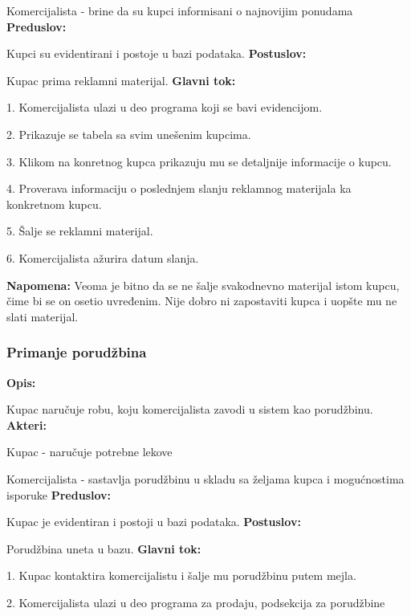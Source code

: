 Komercijalista - brine da su kupci informisani o najnovijim ponudama
\newline
\textbf{Preduslov:}

Kupci su evidentirani i postoje u bazi podataka.
\newline
\textbf{Postuslov:}

Kupac prima reklamni materijal.
\newline
\textbf{Glavni tok:}

1. Komercijalista ulazi u deo programa koji se bavi evidencijom.

2. Prikazuje se tabela sa svim unešenim kupcima. 

3. Klikom na konretnog kupca prikazuju mu se detaljnije informacije o kupcu.

4. Proverava informaciju o poslednjem slanju reklamnog materijala ka konkretnom kupcu.

5. Šalje se reklamni materijal.

6. Komercijalista ažurira datum slanja.

\textbf{Napomena:}
Veoma je bitno da se ne šalje svakodnevno materijal istom kupcu, čime bi se on osetio uvređenim. Nije dobro ni zapostaviti kupca i uopšte mu ne slati materijal.

\clearpage

\subsubsection{Primanje porudžbina}

\textbf{Opis:}

Kupac naručuje robu, koju komercijalista zavodi u sistem kao porudžbinu.
\newline
\textbf{Akteri:}

Kupac - naručuje potrebne lekove

Komercijalista - sastavlja porudžbinu u skladu sa željama kupca i mogućnostima isporuke
\newline
\textbf{Preduslov:}

Kupac je evidentiran i postoji u bazi podataka.
\newline
\textbf{Postuslov:}

Porudžbina uneta u bazu.
\newline
\textbf{Glavni tok:}

1. Kupac kontaktira komercijalistu i šalje mu porudžbinu putem mejla. 

2. Komercijalista ulazi u deo programa za prodaju, podsekcija za porudžbine

